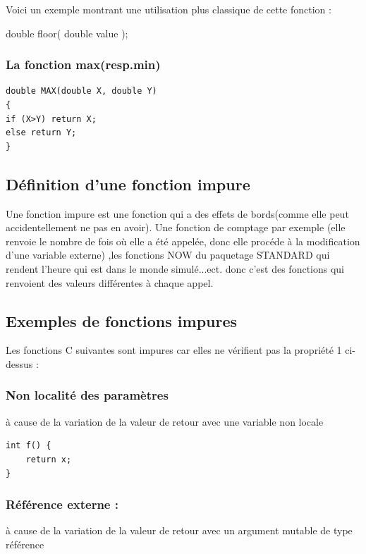 \documentclass[12pt,titlepage]{article}
\begin{document}
Voici un exemple montrant une utilisation plus classique de cette fonction :

double floor( double value );


\subsubsection{La fonction max(resp.min)}

\begin{lstlisting}
double MAX(double X, double Y)
{
if (X>Y) return X;
else return Y;
}
\end{lstlisting}

\subsection{Définition d’une fonction impure}

Une fonction impure est une fonction qui a des effets de bords(comme elle peut accidentellement ne pas en avoir).
Une fonction de comptage par exemple (elle renvoie le nombre de fois où elle a été appelée, donc elle procéde à la modification d’une variable externe) ,les fonctions NOW du paquetage STANDARD qui rendent l’heure qui est dans le monde simulé...ect. donc c'est des fonctions qui renvoient des valeurs différentes à chaque appel.\cite{fctimpures}
\subsection{Exemples de fonctions impures }
Les fonctions C suivantes sont impures car elles ne vérifient pas la propriété 1 ci-dessus :

\subsubsection{Non localité des paramètres}

à cause de la variation de la valeur de retour avec une variable non locale

\begin{lstlisting}
int f() {
    return x;
}
\end{lstlisting}

\subsubsection{Référence externe :}

à cause de la variation de la valeur de retour avec un argument mutable de type référence
\end{document}
